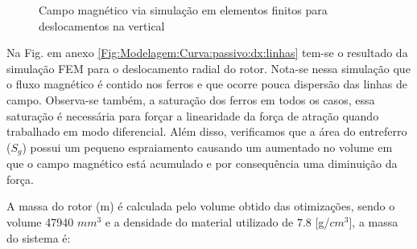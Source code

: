 \begin{figure}[!ht]
	\centering
		\label{Fig:Modelagem:Curva:passivo:dy:linhas:0}
		\label{Fig:Modelagem:Curva:passivo:dy:linhas:1,2}
	\caption{Campo magnético via simulação em elementos finitos para deslocamentos na vertical}
	\label{Fig:Modelagem:Curva:passivo:dy:linhas}
\end{figure}

Na Fig. em anexo \ref{Fig:Modelagem:Curva:passivo:dx:linhas} tem-se o resultado da simulação FEM para o deslocamento radial do rotor. Nota-se nessa simulação que o fluxo magnético é contido nos ferros e que ocorre pouca dispersão das linhas de campo. Observa-se também, a saturação dos ferros em todos os casos, essa saturação é necessária para forçar a linearidade da força de atração quando trabalhado em modo diferencial. Além disso,  verificamos que a área do entreferro ($S_g$) possui um pequeno espraiamento causando um aumentado no volume em que o campo magnético está acumulado e por consequência uma diminuição da força. 


A massa do rotor (m) é calculada pelo volume obtido das otimizações, sendo o volume 47940 $mm^3$ e a densidade do material utilizado de $7.8$ [g/$cm^3$], a massa do sistema é:

